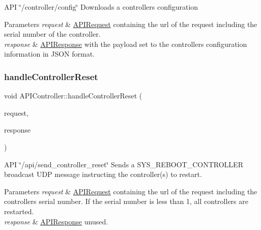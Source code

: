 A\+PI \char`\"{}/controller/config\char`\"{} Downloads a controller\textquotesingle{}s configuration 
\begin{DoxyParams}{Parameters}
{\em request} & \hyperlink{class_a_p_i_request}{A\+P\+I\+Request} containing the url of the request including the serial number of the controller. \\
\hline
{\em response} & \hyperlink{class_a_p_i_response}{A\+P\+I\+Response} with the payload set to the controller\textquotesingle{}s configuration information in J\+S\+ON format. \\
\hline
\end{DoxyParams}
\mbox{\label{class_a_p_i_controller_a0e01eab749423dcfff0b595abf4175ad}} 
\subsubsection{\texorpdfstring{handle\+Controller\+Reset}{handleControllerReset}}
{\footnotesize\ttfamily void A\+P\+I\+Controller\+::handle\+Controller\+Reset (\begin{DoxyParamCaption}\item[{const \hyperlink{class_a_p_i_request}{A\+P\+I\+Request} \&}]{request,  }\item[{\hyperlink{class_a_p_i_response}{A\+P\+I\+Response} $\ast$}]{response }\end{DoxyParamCaption})\hspace{0.3cm}{\ttfamily [slot]}}

A\+PI \char`\"{}/api/send\+\_\+controller\+\_\+reset\char`\"{} Sends a S\+Y\+S\+\_\+\+R\+E\+B\+O\+O\+T\+\_\+\+C\+O\+N\+T\+R\+O\+L\+L\+ER broadcast U\+DP message instructing the controller(s) to restart. 
\begin{DoxyParams}{Parameters}
{\em request} & \hyperlink{class_a_p_i_request}{A\+P\+I\+Request} containing the url of the request including the controller\textquotesingle{}s serial number. If the serial number is less than 1, all controllers are restarted. \\
\hline
{\em response} & \hyperlink{class_a_p_i_response}{A\+P\+I\+Response} unused. \\
\hline
\end{DoxyParams}
\mbox{\label{class_a_p_i_controller_a0d4deeaff703bb7d60eb344e6ee9f8cb}} 
